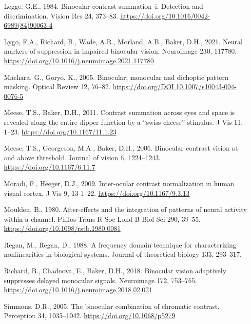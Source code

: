 \documentclass[
  12pt,
]{article}
\newlength{\cslhangindent}
\newenvironment{CSLReferences}[2] %
 {\begin{list}{}{%
  \setlength{\itemindent}{0pt}
  \setlength{\leftmargin}{0pt}
  \setlength{\parsep}{0pt}
  \ifodd #1
   \setlength{\leftmargin}{\cslhangindent}
   \setlength{\itemindent}{-1\cslhangindent}
  \fi
  \setlength{\itemsep}{#2\baselineskip}}}
 {\end{list}}
\begin{document}
\begin{CSLReferences}{1}{0}
Legge, G.E., 1984. Binocular contrast summation--i. Detection and
discrimination. Vision Res 24, 373--83.
\url{https://doi.org/10.1016/0042-6989(84)90063-4}

Lygo, F.A., Richard, B., Wade, A.R., Morland, A.B., Baker, D.H., 2021.
Neural markers of suppression in impaired binocular vision. Neuroimage
230, 117780. \url{https://doi.org/10.1016/j.neuroimage.2021.117780}

Maehara, G., Goryo, K., 2005. Binocular, monocular and dichoptic pattern
masking. Optical Review 12, 76--82.
\href{https://doi.org/DOI\%2010.1007/s10043-004-0076-5}{https://doi.org/DOI
10.1007/s10043-004-0076-5}

Meese, T.S., Baker, D.H., 2011. Contrast summation across eyes and space
is revealed along the entire dipper function by a {``swiss cheese''}
stimulus. J Vis 11, 1--23. \url{https://doi.org/10.1167/11.1.23}

Meese, T.S., Georgeson, M.A., Baker, D.H., 2006. Binocular contrast
vision at and above threshold. Journal of vision 6, 1224--1243.
\url{https://doi.org/10.1167/6.11.7}

Moradi, F., Heeger, D.J., 2009. Inter-ocular contrast normalization in
human visual cortex. J Vis 9, 13 1--22.
\url{https://doi.org/10.1167/9.3.13}

Moulden, B., 1980. After-effects and the integration of patterns of
neural activity within a channel. Philos Trans R Soc Lond B Biol Sci
290, 39--55. \url{https://doi.org/10.1098/rstb.1980.0081}

Regan, M., Regan, D., 1988. A frequency domain technique for
characterizing nonlinearities in biological systems. Journal of
theoretical biology 133, 293--317.

Richard, B., Chadnova, E., Baker, D.H., 2018. Binocular vision
adaptively suppresses delayed monocular signals. Neuroimage 172,
753--765. \url{https://doi.org/10.1016/j.neuroimage.2018.02.021}

Simmons, D.R., 2005. The binocular combination of chromatic contrast.
Perception 34, 1035--1042. \url{https://doi.org/10.1068/p5279}


\end{CSLReferences}
\end{document}
